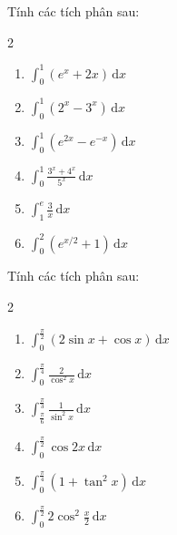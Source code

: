 \documentclass[12pt]{article}
\begin{document}
	\begin{btvang}
		Tính các tích phân sau:
		\begin{multicols}{2}
			\begin{enumerate}[label=\alph*)]
				\item $\displaystyle \int_0^1 (e^x + 2x)\,\mathrm{d}x$
				\item $\displaystyle \int_0^1 (2^x - 3^x)\,\mathrm{d}x$
				\item $\displaystyle \int_0^1 (e^{2x} - e^{-x})\,\mathrm{d}x$
				\item $\displaystyle \int_0^1 \frac{3^x + 4^x}{5^x}\,\mathrm{d}x$
				\item $\displaystyle \int_1^e \frac{3}{x}\,\mathrm{d}x$
				\item $\displaystyle \int_0^2 (e^{x/2} + 1)\,\mathrm{d}x$
			\end{enumerate}
		\end{multicols}
	\end{btvang}
	
	\begin{btdo}
		Tính các tích phân sau:
		\begin{multicols}{2}
			\begin{enumerate}[label=\alph*)]
				\item $\displaystyle \int_0^{\frac{\pi}{2}} (2\sin x + \cos x)\,\mathrm{d}x$
				\item $\displaystyle \int_0^{\frac{\pi}{4}} \frac{2}{\cos^2 x}\,\mathrm{d}x$
				\item $\displaystyle \int_{\frac{\pi}{6}}^{\frac{\pi}{3}} \frac{1}{\sin^2 x}\,\mathrm{d}x$
				\item $\displaystyle \int_0^{\frac{\pi}{2}} \cos 2x\,\mathrm{d}x$
				\item $\displaystyle \int_0^{\frac{\pi}{4}} (1 + \tan^2 x)\,\mathrm{d}x$
				\item $\displaystyle \int_0^{\frac{\pi}{2}} 2\cos^2 \frac{x}{2}\,\mathrm{d}x$
			\end{enumerate}
		\end{multicols}
	\end{btdo}
	
\end{document}

